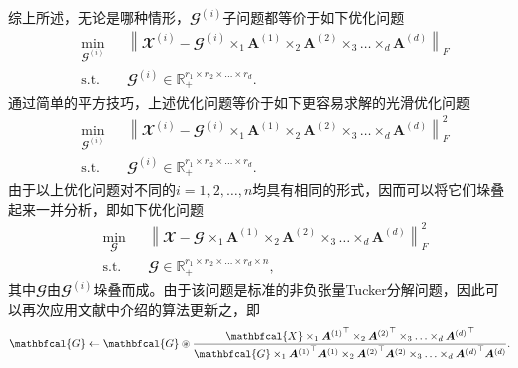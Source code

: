 综上所述，无论是哪种情形，$\mathbfcal{G}^{(i)}$子问题都等价于如下优化问题
\begin{equation*}
    \begin{aligned}
        &\underset{{\mathbfcal{G}^{(i)}}}{\min} && \left\|\mathbfcal{X}^{(i)}-\mathbfcal{G}^{(i)} \times_{1} \boldsymbol{A}^{(1)}\times_{2} \boldsymbol{A}^{(2)}\times_{3}  \ldots \times_{d} \boldsymbol{A}^{(d)}\right\|_{F} \\ &\text{s.t.} && \mathbfcal{G}^{(i)}\in\mathbb{R}_{+}^{r_1 \times r_2 \times \ldots \times r_d}.
    \end{aligned}
\end{equation*}
通过简单的平方技巧，上述优化问题等价于如下更容易求解的光滑优化问题
\begin{equation*}
\begin{aligned}
    &\underset{{\mathbfcal{G}^{(i)}}}{\min} && \left\|\mathbfcal{X}^{(i)}-\mathbfcal{G}^{(i)} \times_{1} \boldsymbol{A}^{(1)}\times_{2} \boldsymbol{A}^{(2)}\times_{3}  \ldots \times_{d} \boldsymbol{A}^{(d)}\right\|_{F}^2 \\ &\text{s.t.} && \mathbfcal{G}^{(i)}\in\mathbb{R}_{+}^{r_1 \times r_2 \times \ldots \times r_d}.
\end{aligned}
\end{equation*}
由于以上优化问题对不同的$i=1,2,\ldots,n$均具有相同的形式，因而可以将它们垛叠起来一并分析，即如下优化问题
\begin{equation*}
\begin{aligned}
    &\underset{\mathbfcal{G}}{\min}&& \left\|\mathbfcal{X}-\mathbfcal{G} \times_{1} \boldsymbol{A}^{(1)} \times_{2} \boldsymbol{A}^{(2)}\times_{3} \ldots \times_{d} \boldsymbol{A}^{(d)}\right\|_{F}^2 \\ &\text{s.t.}&& \mathbfcal{G}\in\mathbb{R}_{+}^{r_1 \times r_2 \times \ldots \times r_d \times n},
\end{aligned}
\end{equation*}
其中$\mathbfcal{G}$由$\mathbfcal{G}^{(i)}$垛叠而成。由于该问题是标准的非负张量Tucker分解问题，因此可以再次应用文献中介绍的算法更新之，即
\begin{equation}\label{eq:linf-updateG}
	\mathbfcal{G} \leftarrow \mathbfcal{G} \oast \frac{\mathbfcal{X} \times_{1} {\boldsymbol{A}^{(1)}}^{\top}\times_{2} {\boldsymbol{A}^{(2)}}^{\top}\times_{3}  \ldots \times_{d} {\boldsymbol{A}^{(d)}}^{\top}}
	{\mathbfcal{G} \times_{1} {\boldsymbol{A}^{(1)}}^{\top} \boldsymbol{A}^{(1)} \times_{2} {\boldsymbol{A}^{(2)}}^{\top} \boldsymbol{A}^{(2)} \times_{3}  \ldots \times_{d} {\boldsymbol{A}^{(d)}}^{\top} \boldsymbol{A}^{(d)}}.
\end{equation}

